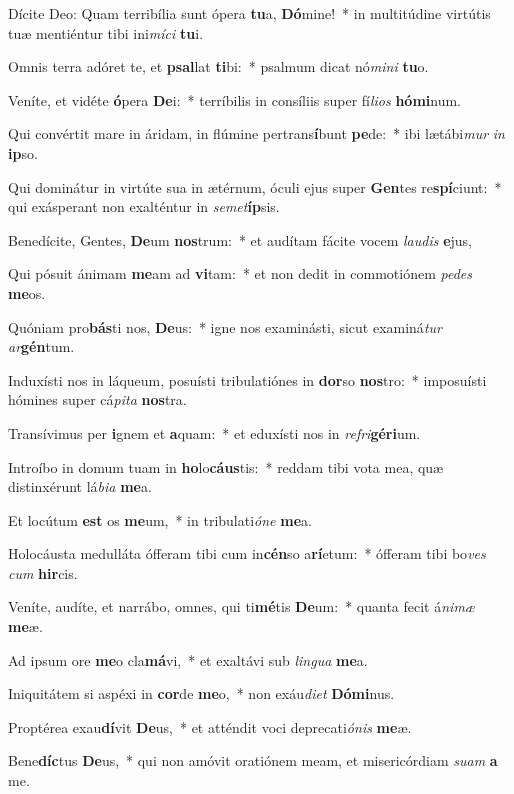 \item Dícite Deo: Quam terribília sunt ópera \textbf{tu}a, \textbf{Dó}mine!~* in multitúdine virtútis tuæ mentiéntur tibi ini\textit{mí}\textit{ci} \textbf{tu}i.
\item Omnis terra adóret te, et \textbf{psal}lat \textbf{ti}bi:~* psalmum dicat nó\textit{mi}\textit{ni} \textbf{tu}o.
\item Veníte, et vidéte \textbf{ó}pera \textbf{De}i:~* terríbilis in consíliis super fí\textit{li}\textit{os} \textbf{hó}\textbf{mi}num.
\item Qui convértit mare in áridam, in flúmine pertrans\textbf{í}bunt \textbf{pe}de:~* ibi lætábi\textit{mur} \textit{in} \textbf{ip}so.
\item Qui dominátur in virtúte sua in ætérnum, óculi ejus super \textbf{Gen}tes re\textbf{spí}ciunt:~* qui exásperant non exalténtur in \textit{se}\textit{met}\textbf{íp}sis.
\item Benedícite, Gentes, \textbf{De}um \textbf{nos}trum:~* et audítam fácite vocem \textit{lau}\textit{dis} \textbf{e}jus,
\item Qui pósuit ánimam \textbf{me}am ad \textbf{vi}tam:~* et non dedit in commotiónem \textit{pe}\textit{des} \textbf{me}os.
\item Quóniam pro\textbf{bás}ti nos, \textbf{De}us:~* igne nos examinásti, sicut examiná\textit{tur} \textit{ar}\textbf{gén}tum.
\item Induxísti nos in láqueum, posuísti tribulatiónes in \textbf{dor}so \textbf{nos}tro:~* imposuísti hómines super cá\textit{pi}\textit{ta} \textbf{nos}tra.
\item Transívimus per \textbf{i}gnem et \textbf{a}quam:~* et eduxísti nos in \textit{re}\textit{fri}\textbf{gé}\textbf{ri}um.
\item Introíbo in domum tuam in \textbf{ho}lo\textbf{cáus}tis:~* reddam tibi vota mea, quæ distinxérunt lá\textit{bi}\textit{a} \textbf{me}a.
\item Et locútum \textbf{est} os \textbf{me}um,~* in tribulati\textit{ó}\textit{ne} \textbf{me}a.
\item Holocáusta medulláta ófferam tibi cum in\textbf{cén}so a\textbf{rí}etum:~* ófferam tibi bo\textit{ves} \textit{cum} \textbf{hir}cis.
\item Veníte, audíte, et narrábo, omnes, qui ti\textbf{mé}tis \textbf{De}um:~* quanta fecit á\textit{ni}\textit{mæ} \textbf{me}æ.
\item Ad ipsum ore \textbf{me}o cla\textbf{má}vi,~* et exaltávi sub \textit{lin}\textit{gua} \textbf{me}a.
\item Iniquitátem si aspéxi in \textbf{cor}de \textbf{me}o,~* non exáu\textit{di}\textit{et} \textbf{Dó}\textbf{mi}nus.
\item Proptérea exau\textbf{dí}vit \textbf{De}us,~* et atténdit voci deprecati\textit{ó}\textit{nis} \textbf{me}æ.
\item Bene\textbf{díc}tus \textbf{De}us,~* qui non amóvit oratiónem meam, et misericórdiam \textit{su}\textit{am} \textbf{a} me.
